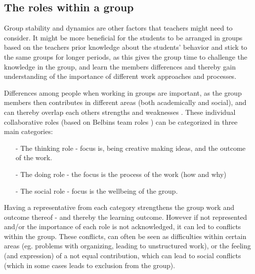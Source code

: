 \subsection{The roles within a group}
Group stability and dynamics are other factors that teachers might need to consider. It might be more beneficial for the students to be arranged in groups based on the teachers prior knowledge about the students' behavior and stick to the same groups for longer periods\cite{collaborationSocialPedagogy}, as this gives the group time to challenge the knowledge in the group, and learn the members differences and thereby gain understanding of the importance of different work approaches and processes\cite{laeringIPraksis}.

Differences among people when working in groups are important, as the group members then contributes in different areas (both academically and social), and can thereby overlap each others strengths and weaknesses \cite{ProjektarbejdesKompleksitet}. These individual collaborative roles (based on Belbins team roles \cite{ProjektarbejdesKompleksitet}) can be categorized in three main categories: 
\begin{itemize}
	\item[-] The thinking role - focus is, being creative making ideas, and the outcome of the work. 
	\item[-] The doing role - the focus is the process of the work (how and why)
	\item[-] The social role - focus is the wellbeing of the group. 
\end{itemize}

Having a representative from each category strengthens the group work and outcome thereof - and thereby the learning outcome\cite{ProjektarbejdesKompleksitet}. However if not represented and/or the importance of each role is not acknowledged, it can led to conflicts within the group. These conflicts, can often be seen as difficulties within certain areas (eg. problems with organizing, leading to unstructured work), or the feeling (and expression) of a not equal contribution, which can lead to social conflicts (which in some cases leads to exclusion from the group)\cite{ProjektarbejdesKompleksitet}. 

